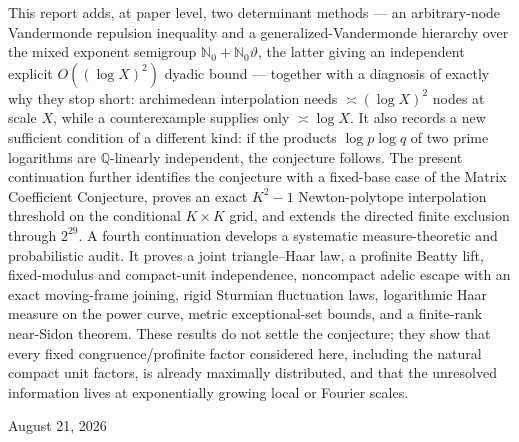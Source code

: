 \documentclass[11pt,oneside]{article}
\theoremstyle{definition}
\theoremstyle{remark}
\newcommand{\Nzero}{\mathbb N_0}
\newcommand{\Q}{\mathbb Q}
\newcommand{\thetaq}{\vartheta}
\begin{document}
\begin{titlepage}
\begin{minipage}{0.9\textwidth}
This report adds, at paper level, two determinant methods --- an arbitrary-node Vandermonde
repulsion inequality and a generalized-Vandermonde hierarchy over the mixed exponent semigroup
$\Nzero+\Nzero\thetaq$, the latter giving an independent explicit $O((\log X)^2)$ dyadic
bound --- together with a diagnosis of exactly why they stop short: archimedean interpolation
needs $\asymp(\log X)^2$ nodes at scale $X$, while a counterexample supplies only
$\asymp\log X$.  It also records a new sufficient condition of a different kind: if the
products $\log p\log q$ of two prime logarithms are $\Q$-linearly independent, the conjecture
follows.  The present continuation further identifies the conjecture with a fixed-base case of
the Matrix Coefficient Conjecture, proves an exact $K^2-1$ Newton-polytope interpolation
threshold on the conditional $K\times K$ grid, and extends the directed finite exclusion
through $2^{29}$.  A fourth continuation develops a systematic measure-theoretic and
probabilistic audit.  It proves a joint triangle--Haar law, a profinite Beatty lift,
fixed-modulus and compact-unit independence, noncompact adelic escape with an exact
moving-frame joining, rigid Sturmian fluctuation laws, logarithmic Haar measure on the
power curve, metric exceptional-set bounds, and a finite-rank near-Sidon theorem.  These
results do not settle the conjecture; they show that every fixed congruence/profinite factor
considered here, including the natural compact unit factors, is already maximally distributed,
and that the unresolved information lives at exponentially growing local or Fourier scales.
\end{minipage}
\vfill
{\large August 21, 2026\par}
\end{titlepage}

\end{document}
